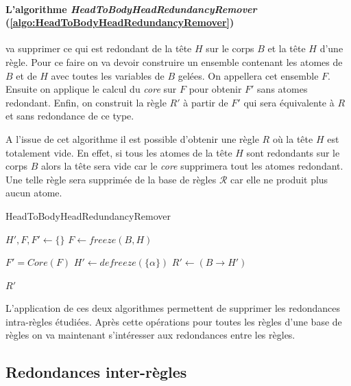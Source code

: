 \paragraph{L'algorithme \textit{HeadToBodyHeadRedundancyRemover} (\ref{algo:HeadToBodyHeadRedundancyRemover})}
va supprimer ce qui est redondant de la tête $H$ sur le corps $B$ et la tête $H$ d'une règle. Pour ce faire on va devoir construire un ensemble contenant les atomes de $B$ et de $H$ avec toutes les variables de $B$ gelées. On appellera cet ensemble $F$. Ensuite on applique le calcul du \textit{core} sur $F$ pour obtenir $F'$ sans atomes redondant. Enfin, on construit la règle $R'$ à partir de $F'$ qui sera équivalente à $R$ et sans redondance de ce type. 
\par A l'issue de cet algorithme il est possible d'obtenir une règle $R$ où la tête $H$ est totalement vide. En effet, si tous les atomes de la tête $H$ sont redondants sur le corps $B$ alors la tête sera vide car le \textit{core} supprimera tout les atomes redondant. Une telle règle sera supprimée de la base de règles $\mathcal{R}$ car elle ne produit plus aucun atome.
\newline


\begin{algorithm}[H]\label{algo:HeadToBodyHeadRedundancyRemover}
\caption{HeadToBodyHeadRedundancyRemover} %
\SetAlgoLined
\DontPrintSemicolon
\SetAlgoLined
\DontPrintSemicolon
{}
    $H', F, F'\gets \{\} $ 
    $F \gets freeze(B, H)$ 
   
    $F' = Core(F)$\;
    {
        {
            $H' \gets defreeze(\{\alpha\})$\;
        }
    }
    $R' \gets (B \rightarrow H')$\;

    \Return $R'$
\end{algorithm}


\par L'application de ces deux algorithmes permettent de supprimer les redondances intra-règles étudiées. Après cette opérations pour toutes les règles d'une base de règles on va maintenant s'intéresser aux redondances entre les règles.

\subsection{Redondances inter-règles}\label{sec:inter-regles}

